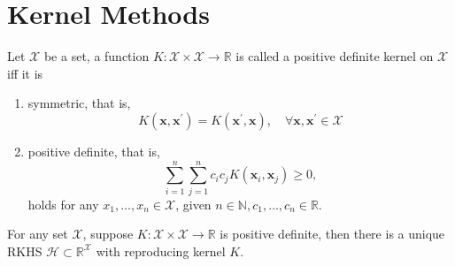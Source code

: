 \chapter{Kernel Methods}

\begin{definition}
    Let $\mathcal{X}$ be a set, a function $K:\mathcal{X}\times\mathcal{X}\rightarrow\mathbb{R}$ is called a positive definite kernel on $\mathcal{X}$ iff it is
    \begin{enumerate}
        \item symmetric, that is,
              \begin{equation}
                  K\left(\mathbf{x},\mathbf{x}^{\prime}\right)=K\left(\mathbf{x}^{\prime},\mathbf{x}\right),\quad\forall\mathbf{x},\mathbf{x}^{\prime}\in\mathcal{X}
              \end{equation}
        \item positive definite, that is,
              \begin{equation}
                  \sum_{i=1}^{n}\sum_{j=1}^{n}c_{i}c_{j}K\left(\mathbf{x}_{i},\mathbf{x}_{j}\right)\geq 0,
              \end{equation}
              holds for any $x_{1},\ldots,x_{n}\in\mathcal{X}$, given $n\in\mathbb{N},c_{1},\ldots,c_{n}\in\mathbb{R}$.
    \end{enumerate}
\end{definition}

\begin{theorem} \label{thm:morse-aronszajn}
    For any set $\mathcal{X}$, suppose $K:\mathcal{X}\times\mathcal{X}\rightarrow\mathbb{R}$ is positive definite, then there is a unique RKHS $\mathcal{H}\subset\mathbb{R}^{\mathcal{X}}$ with reproducing kernel $K$.
\end{theorem}

